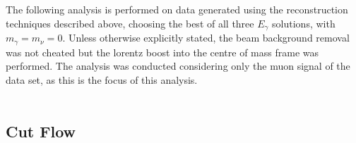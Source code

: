 The following analysis is performed on data generated using the reconstruction techniques described above, choosing the best of all three ${E}_{\gamma}$ solutions, with  ${m}_{\gamma} = {m}_{\nu} = 0$. Unless otherwise explicitly stated, the beam background removal was not cheated but the lorentz boost into the centre of mass frame was performed. The analysis was conducted considering only the muon signal of the data set, as this is the focus of this analysis.
\\\\

\subsection{Cut Flow}
\label{SUBSEC:CutFlow}

